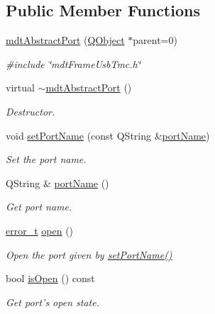 \subsection*{Public Member Functions}
\begin{DoxyCompactItemize}
\item 
\hyperlink{classmdt_abstract_port_a35e7bff9413690833c832bf115da102f}{mdt\-Abstract\-Port} (\hyperlink{class_q_object}{Q\-Object} $\ast$parent=0)
\begin{DoxyCompactList}\small\item\em \#include \char`\"{}mdt\-Frame\-Usb\-Tmc.\-h\char`\"{} \end{DoxyCompactList}\item 
virtual \hyperlink{classmdt_abstract_port_aa40baa0c593fef984f3796acafceee15}{$\sim$mdt\-Abstract\-Port} ()
\begin{DoxyCompactList}\small\item\em Destructor. \end{DoxyCompactList}\item 
void \hyperlink{classmdt_abstract_port_a0ca143d32fc677bac7c1cf0e04144932}{set\-Port\-Name} (const Q\-String \&\hyperlink{classmdt_abstract_port_ac52fbd121f7cbb848a2f3e5d29fae615}{port\-Name})
\begin{DoxyCompactList}\small\item\em Set the port name. \end{DoxyCompactList}\item 
Q\-String \& \hyperlink{classmdt_abstract_port_ac52fbd121f7cbb848a2f3e5d29fae615}{port\-Name} ()
\begin{DoxyCompactList}\small\item\em Get port name. \end{DoxyCompactList}\item 
\hyperlink{classmdt_abstract_port_ad4121bb930c95887e77f8bafa065a85e}{error\-\_\-t} \hyperlink{classmdt_abstract_port_a4e0f0b7f9e24257677184e4bde10fdde}{open} ()
\begin{DoxyCompactList}\small\item\em Open the port given by \hyperlink{classmdt_abstract_port_a0ca143d32fc677bac7c1cf0e04144932}{set\-Port\-Name()} \end{DoxyCompactList}\item 
bool \hyperlink{classmdt_abstract_port_a2122ae3141342ff38c8388e62b244e3b}{is\-Open} () const 
\begin{DoxyCompactList}\small\item\em Get port's open state. \end{DoxyCompactList}\item 

\end{DoxyCompactItemize}
